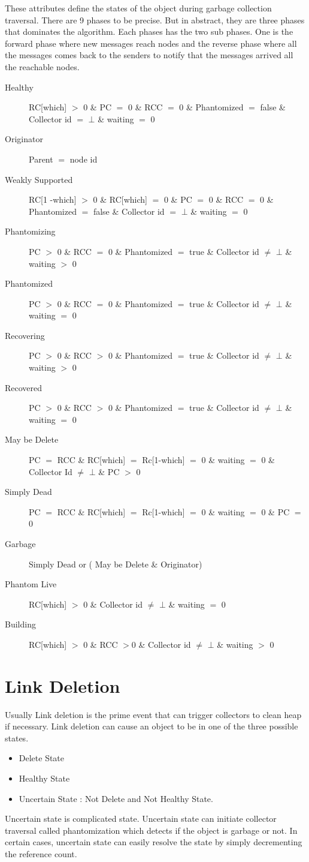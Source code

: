 \documentclass{article}
\begin{document}
These attributes define the states of the object during garbage collection traversal. There are 9 phases to be precise. But in abstract, they are three phases that dominates the algorithm. Each phases has the two sub phases. One is the forward phase where new messages reach nodes and the reverse phase where all the messages comes back to the senders to notify that the messages arrived all the reachable nodes. 
\begin{description}
  \item[Healthy] RC[which] $>$ 0 \& PC $=$ 0 \& RCC $=$ 0 \& Phantomized $=$ false \& Collector id $=$ $\bot$ \& waiting $=$ 0
  \item[Originator] Parent $=$ node id 
  \item[Weakly Supported] RC[1 -which] $>$ 0 \& RC[which] $=$ 0 \& PC $=$ 0 \& RCC $=$ 0 \& Phantomized $=$ false \& Collector id $=$ $\bot$ \& waiting $=$ 0
  \item[Phantomizing] PC $>$ 0 \& RCC $=$ 0 \& Phantomized $=$ true \& Collector id $\neq$ $\bot$ \& waiting $>$ 0
  \item[Phantomized] PC $>$ 0 \& RCC $=$ 0 \& Phantomized $=$ true \& Collector id $\neq$ $\bot$ \& waiting $=$ 0
   \item[Recovering] PC $>$ 0 \& RCC $>$ 0 \& Phantomized $=$ true \& Collector id $\neq$ $\bot$ \& waiting $>$ 0
   \item[Recovered] PC $>$ 0 \& RCC $>$ 0 \& Phantomized $=$ true \& Collector id $\neq$ $\bot$ \& waiting $=$ 0
  \item[May be Delete] PC $=$ RCC \& RC[which] $=$ Rc[1-which] $=$ 0 \& waiting $=$ 0 \& Collector Id $\neq$ $\bot$ \& PC $>$ 0
  	\item [Simply Dead] PC $=$ RCC \& RC[which] $=$ Rc[1-which] $=$ 0 \& waiting $=$ 0 \& PC $=$ 0 
  	\item [Garbage] Simply Dead or  ( May be Delete \& Originator)
  \item[Phantom Live] RC[which] $>$ 0 \& Collector id $\neq$ $\bot$ \& waiting $=$ 0
   \item[Building] RC[which] $>$ 0 \& RCC $>$0 \& Collector id $\neq$ $\bot$ \& waiting $>$ 0

\end{description}
\section{Link Deletion}
	Usually Link deletion is the prime event that can trigger collectors to clean heap if necessary. Link deletion can cause an object to be in one of the three possible states. 
\begin{itemize}
  \item Delete State
  \item Healthy State
  \item Uncertain State : Not Delete and Not Healthy State.
\end{itemize}
	Uncertain state is complicated state. Uncertain state can initiate collector traversal called phantomization which detects if the object is garbage or not. In certain cases, uncertain state can easily resolve the state by simply decrementing the reference count. 
\end{document}
